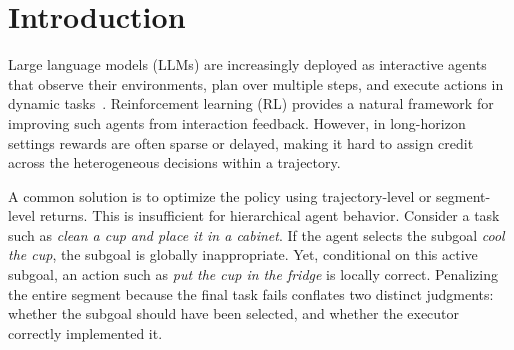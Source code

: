 \documentclass{article}
\newcommand{\wei}[1]{\textcolor{red}{#1}}
\begin{document}




\section{Introduction}

Large language models (LLMs) are increasingly deployed as interactive agents that observe their environments, plan over multiple steps, and execute actions in dynamic tasks~\cite{yao2022react,shinn2023reflexion,wang2024voyager}. Reinforcement learning (RL) provides a natural framework for improving such agents from interaction feedback. However, in long-horizon settings rewards are often sparse or delayed, making it hard to assign credit across the heterogeneous decisions within a trajectory.


A common solution is to optimize the policy using trajectory-level or segment-level returns. This is insufficient for hierarchical agent behavior. Consider a task such as \emph{clean a cup and place it in a cabinet}. If the agent selects the subgoal \emph{cool the cup}, the subgoal is globally inappropriate. Yet, conditional on this active subgoal, an action such as \emph{put the cup in the fridge} is locally correct. Penalizing the entire segment because the final task fails conflates two distinct judgments: whether the subgoal should have been selected, and whether the executor correctly implemented it.
\end{document}
